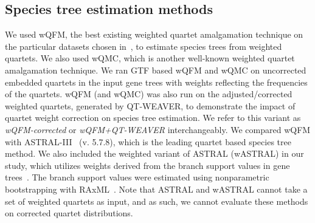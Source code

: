 \documentclass[runningheads]{llncs}
\newcommand{\add}[1]{{\color{blue} #1}}
\newcommand{\addb}[1]{{\color{red} #1}}
\begin{document}
\subsection{Species tree estimation methods}
\vspace{-3pt}
We used wQFM, \add{the best existing weighted quartet amalgamation technique on the particular datasets chosen in~\cite{wqfm}}, to estimate species trees from weighted quartets. We also used wQMC, which is another well-known weighted quartet amalgamation technique. %
We ran GTF based wQFM and wQMC on uncorrected embedded quartets in the input gene trees with weights reflecting the frequencies of the quartets. %
wQFM (and wQMC) was also run on the adjusted/corrected weighted quartets, generated by QT-WEAVER, to demonstrate the impact of quartet weight correction on species tree estimation. We refer to this variant as \textit{wQFM-corrected} or \textit{wQFM+QT-WEAVER} interchangeably. We compared wQFM with ASTRAL-III~\cite{astral,zhang2018astral} (v. 5.7.8), which is the leading quartet based species tree method. We also included the weighted variant of ASTRAL (wASTRAL) in our study, which utilizes weights derived from the branch support values in gene trees~\cite{zhang2022weighting}. The branch support values were estimated using nonparametric bootstrapping with RAxML~\cite{raxml-bootstrap}. Note that ASTRAL and wASTRAL cannot take a set of weighted quartets as input, and as such, we cannot evaluate these methods on corrected quartet distributions.



 
\end{document}
